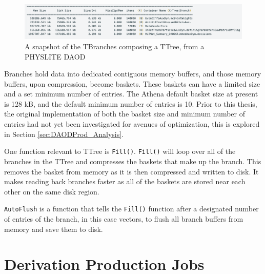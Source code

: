 \begin{figure}[ht]
  \centering
  \includegraphics[width=\textwidth]{content/img/branches_in_TTree.png}
  \caption{A snapshot of the TBranches composing a TTree, from a PHYSLITE DAOD}
  \label{fig:Branches_in_TTree}
\end{figure}

Branches hold data into dedicated contiguous memory buffers, and those memory buffers, upon compression, become baskets.
These baskets can have a limited size and a set minimum number of entries. 
The Athena default basket size at present is 128 kB, and the default minimum number of entries is 10. 
Prior to this thesis, the original implementation of both the basket size and minimum number of entries had not yet been investigated for avenues of optimization, this is explored in Section \ref{sec:DAODProd_Analysis}.


One function relevant to TTree is \verb|Fill()|. 
\verb|Fill()| will loop over all of the branches in the TTree and compresses the baskets that make up the branch.
This removes the basket from memory as it is then compressed and written to disk.
It makes reading back branches faster as all of the baskets are stored near each other on the same disk region.\cite{ROOT_TTree}

\verb|AutoFlush| is a function that tells the \verb|Fill()| function after a designated number of entries of the branch, in this case vectors, to flush all branch buffers from memory and save them to disk. 


\section{Derivation Production Jobs}
 \label{section: ATLASIO_Derivation}

